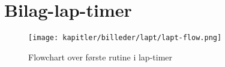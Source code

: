 \section{Bilag-lap-timer}
\begin{figure}
\centering
\texttt{[image: kapitler/billeder/lapt/lapt-flow.png]}
\caption{Flowchart over første rutine i lap-timer}
\label{fig:lapt-flow}
\end{figure}

